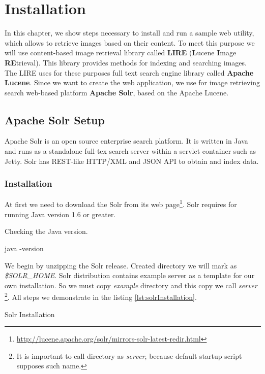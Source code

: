 \documentclass[12pt,a4paper]{report}
\begin{document}
\tableofcontents

\chapter{Installation}
\label{ch:installation}
In this chapter, we show steps necessary to install and run a sample web utility, which allows to retrieve images based on their content. To meet this purpose we will use content-based image retrieval library called \textbf{LIRE} (\textbf{L}ucene \textbf{I}mage \textbf{RE}trieval). This library provides methods for indexing and searching images. The LIRE uses for these purposes full text search engine library called \textbf{Apache Lucene}. Since we want to create the web application, we use for image retrieving search web-based platform \textbf{Apache Solr}, based on the Apache Lucene.

\section{Apache Solr Setup}
Apache Solr is an open source enterprise search platform. It is written in Java and runs as a standalone full-tex search server within a servlet container such as Jetty. Solr has REST-like HTTP/XML and JSON API to obtain and index data.\cite{solr}

\subsection{Installation}
At first we need to download the Solr from its web page\footnote{\url{http://lucene.apache.org/solr/mirrors-solr-latest-redir.html}}. Solr requires for running Java version 1.6 or greater.

\begin{listing}[H]
\caption{Checking the Java version.}
\begin{bashcode}
java -version
\end{bashcode}
\end{listing}

We begin by unzipping the Solr release. Created directory we will mark as \textit{\$SOLR\_HOME}. Solr distribution contains example server as a template for our own installation. So we must copy \textit{example} directory and this copy we call \textit{server} \footnote{It is important to call directory as \textit{server}, because default startup script supposes such name.}. All steps we demonstrate in the listing \ref{lst:solrInstallation}.

\begin{listing}[H]
\caption{Solr Installation}
\label{lst:solrInstallation}
\end{listing}
\end{document}
